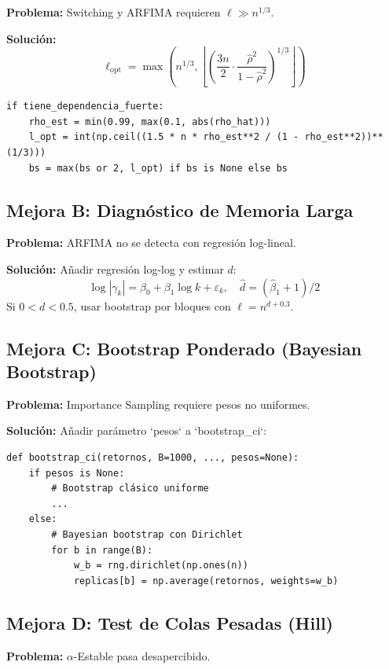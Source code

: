 \documentclass[12pt,a4paper]{article}
\begin{document}
\textbf{Problema:} Switching y ARFIMA requieren $\ell \gg n^{1/3}$.

\textbf{Solución:}
\[
\ell_{\text{opt}} = \max\left( n^{1/3}, \left\lfloor \left(\frac{3n}{2} \cdot \frac{\hat{\rho}^2}{1-\hat{\rho}^2}\right)^{1/3} \right\rfloor \right)
\]

\begin{lstlisting}
if tiene_dependencia_fuerte:
    rho_est = min(0.99, max(0.1, abs(rho_hat)))
    l_opt = int(np.ceil((1.5 * n * rho_est**2 / (1 - rho_est**2))**(1/3)))
    bs = max(bs or 2, l_opt) if bs is None else bs
\end{lstlisting}

\subsection{Mejora B: Diagnóstico de Memoria Larga}

\textbf{Problema:} ARFIMA no se detecta con regresión log-lineal.

\textbf{Solución:} Añadir regresión log-log y estimar $d$:
\[
\log|\gamma_k| = \beta_0 + \beta_1 \log k + \varepsilon_k, \quad \hat{d} = (\hat{\beta}_1 + 1)/2
\]
Si $0 < d < 0.5$, usar bootstrap por bloques con $\ell = n^{d+0.3}$.

\subsection{Mejora C: Bootstrap Ponderado (Bayesian Bootstrap)}

\textbf{Problema:} Importance Sampling requiere pesos no uniformes.

\textbf{Solución:} Añadir parámetro `pesos` a `bootstrap_ci`:

\begin{lstlisting}
def bootstrap_ci(retornos, B=1000, ..., pesos=None):
    if pesos is None:
        # Bootstrap clásico uniforme
        ...
    else:
        # Bayesian bootstrap con Dirichlet
        for b in range(B):
            w_b = rng.dirichlet(np.ones(n))
            replicas[b] = np.average(retornos, weights=w_b)
\end{lstlisting}

\subsection{Mejora D: Test de Colas Pesadas (Hill)}

\textbf{Problema:} $\alpha$-Estable pasa desapercibido.
\end{document}
